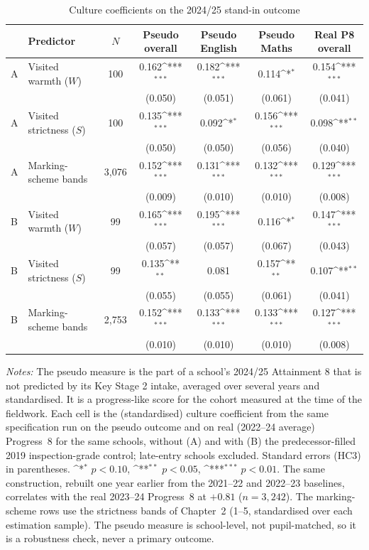 \begin{table}[htbp]\centering
\caption{Culture coefficients on the 2024/25 stand-in outcome}
\label{tab:p8_proxy}
\def\sym#1{\ifmmode^{#1}\else\(^{#1}\)\fi}
\small
\footnotesize\setlength{\tabcolsep}{4pt}
\begin{tabular}{llccccc}
\toprule
 & Predictor & $N$ & \shortstack{Pseudo\\overall} & \shortstack{Pseudo\\English} & \shortstack{Pseudo\\Maths} & \shortstack{Real P8\\overall} \\
\midrule
A & Visited warmth ($W$) & 100 & 0.162\sym{***} & 0.182\sym{***} & 0.114\sym{*} & 0.154\sym{***} \\
 & & & (0.050) & (0.051) & (0.061) & (0.041) \\
A & Visited strictness ($S$) & 100 & 0.135\sym{***} & 0.092\sym{*} & 0.156\sym{***} & 0.098\sym{**} \\
 & & & (0.050) & (0.050) & (0.056) & (0.040) \\
A & Marking-scheme bands & 3{,}076 & 0.152\sym{***} & 0.131\sym{***} & 0.132\sym{***} & 0.129\sym{***} \\
 & & & (0.009) & (0.010) & (0.010) & (0.008) \\
\addlinespace
B & Visited warmth ($W$) & 99 & 0.165\sym{***} & 0.195\sym{***} & 0.116\sym{*} & 0.147\sym{***} \\
 & & & (0.057) & (0.057) & (0.067) & (0.043) \\
B & Visited strictness ($S$) & 99 & 0.135\sym{**} & 0.081 & 0.157\sym{**} & 0.107\sym{**} \\
 & & & (0.055) & (0.055) & (0.061) & (0.041) \\
B & Marking-scheme bands & 2{,}753 & 0.152\sym{***} & 0.133\sym{***} & 0.133\sym{***} & 0.127\sym{***} \\
 & & & (0.010) & (0.010) & (0.010) & (0.008) \\
\bottomrule
\end{tabular}
\begin{minipage}{\linewidth}
\smallskip
\footnotesize\textit{Notes:} The pseudo measure is the part of a school's 2024/25 Attainment 8 that is not predicted by its Key Stage 2 intake, averaged over several years and standardised. It is a progress-like score for the cohort measured at the time of the fieldwork. Each cell is the (standardised) culture coefficient from the same specification run on the pseudo outcome and on real (2022--24 average) Progress~8 for the same schools, without (A) and with (B) the predecessor-filled 2019 inspection-grade control; late-entry schools excluded. Standard errors (HC3) in parentheses.
\sym{*} \(p<0.10\), \sym{**} \(p<0.05\), \sym{***} \(p<0.01\).
 The same construction, rebuilt one year earlier from the 2021--22 and 2022--23 baselines, correlates with the real 2023--24 Progress~8 at $+0.81$ ($n = 3{,}242$). The marking-scheme rows use the strictness
bands of Chapter~2 (1--5, standardised over each estimation sample). The pseudo measure is
school-level, not pupil-matched, so it is a robustness check, never a primary outcome.
\end{minipage}
\end{table}
